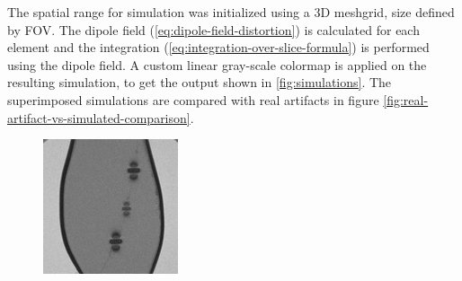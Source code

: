 \documentclass[conference]{IEEEtran}
\begin{document}
The spatial range for simulation was initialized using a 3D meshgrid, size defined by FOV. The dipole field (\ref{eq:dipole-field-distortion}) is calculated for each element and the integration (\ref{eq:integration-over-slice-formula}) is performed using the dipole field. A custom linear gray-scale colormap is applied on the resulting simulation, to get the output shown in \autoref{fig:simulations}. The superimposed simulations are compared with real artifacts in figure \autoref{fig:real-artifact-vs-simulated-comparison}.

\begin{figure}[h]
    \centering
    \begin{minipage}{0.241\textwidth}
        \centering
        \includegraphics[width=\textwidth]{Conference/img/artifact-real.jpg}
    \end{minipage}\hfill \hspace*{0cm}
    \begin{minipage}{0.241\textwidth}
        \centering

\end{minipage}
\end{figure}
\end{document}

